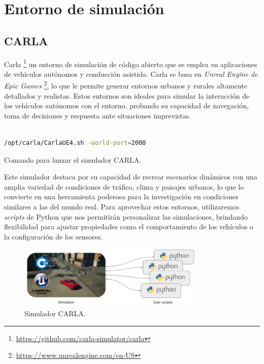 \section{Entorno de simulación}
\label{sec:sim}
\subsection{CARLA}
\label{sec:carls}

Carla \footnote{\url{https://github.com/carla-simulator/carla}} un entorno de simulación de código abierto que se emplea en aplicaciones de vehículos autónomos y conducción asistida. Carla se basa en \textit{Unreal Engine de Epic Games} \footnote{\url{https://www.unrealengine.com/en-US}}, lo que le permite generar entornos urbanos y rurales altamente detallados y realistas. Estos entornos son ideales para simular la interacción de los vehículos autónomos con el entorno, probando su capacidad de navegación, toma de decisiones y respuesta ante situaciones imprevistas.

\begin{code}[h]
\begin{lstlisting}[language=bash]

/opt/carla/CarlaUE4.sh -world-port=2000

\end{lstlisting}
\caption[Comando para lanzar el simulador CARLA]{Comando para lanzar el simulador CARLA.}
\label{cod:cmdcarla}
\end{code}

Este simulador destaca por su capacidad de recrear escenarios dinámicos con una amplia variedad de condiciones de tráfico, clima y paisajes urbanos, lo que lo convierte en una herramienta poderosa para la investigación en condiciones similares a las del mundo real. Para aprovechar estos entornos, utilizaremos \textit{scripts} de Python que nos permitirán personalizar las simulaciones, brindando flexibilidad para ajustar propiedades como el comportamiento de los vehículos o la configuración de los sensores.

\begin{figure}[ht]
  \begin{center}
    \includegraphics[width=9cm]{figs/Plataformas_Desarollo/carla.png}
  \end{center}
  \caption{Simulador CARLA.}
  \label{carla}
\end{figure}


